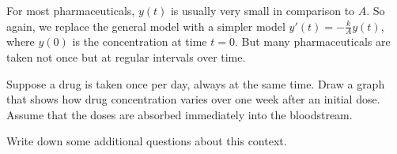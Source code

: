 \documentclass[handout,space,nooutcomes]{ximera}
\begin{document}
\begin{question}
For most pharmaceuticals, $y(t)$ is usually very small in comparison to $A$.   So again, we replace the general model with a simpler model $y'(t)=-\frac{k}{A}y(t)$, where $y(0)$ is the concentration at time $t=0$.  But many pharmaceuticals are taken not once but at regular intervals over time.  

Suppose a drug is taken once per day, always at the same time.  Draw a graph that shows how drug concentration varies over one week after an initial dose.  Assume that the doses are absorbed immediately into the bloodstream.  
\begin{freeResponse}
\end{freeResponse}
\end{question}

\begin{question}
Write down some additional questions about this context.       
\begin{freeResponse}
\end{freeResponse}
\end{question}
\end{document}
